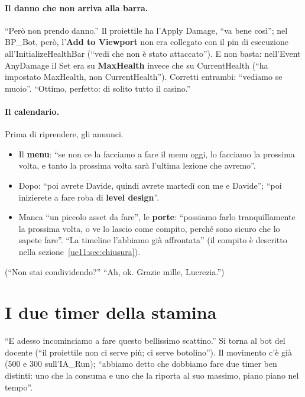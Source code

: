 \paragraph{Il danno che non arriva alla barra.} ``Però non prendo danno.'' Il proiettile ha
l'Apply Damage, ``va bene così''; nel BP\_Bot, però, l'\textbf{Add to Viewport} non era
collegato con il pin di esecuzione all'InitializeHealthBar (``vedi che non è stato
attaccato''). E non basta: nell'Event AnyDamage il Set era su \textbf{MaxHealth} invece che
su CurrentHealth (``ha impostato MaxHealth, non CurrentHealth''). Corretti entrambi:
``vediamo se muoio''. ``Ottimo, perfetto: di solito tutto il casino.''

\paragraph{Il calendario.} Prima di riprendere, gli annunci.
\begin{itemize}
  \item Il \textbf{menu}: ``se non ce la facciamo a fare il menu oggi, lo facciamo la
        prossima volta, e tanto la prossima volta sarà l'ultima lezione che avremo''.
  \item Dopo: ``poi avrete Davide, quindi avrete martedì con me e Davide''; ``poi
        inizierete a fare roba di \textbf{level design}''.
  \item Manca ``un piccolo asset da fare'', le \textbf{porte}: ``possiamo farlo
        tranquillamente la prossima volta, o ve lo lascio come compito, perché sono sicuro
        che lo sapete fare''. ``La timeline l'abbiamo già affrontata'' (il compito è
        descritto nella sezione~\ref{ue11:sec:chiusura}).
\end{itemize}
(``Non stai condividendo?'' ``Ah, ok. Grazie mille, Lucrezia.'')

\section{I due timer della stamina}
\label{ue11:sec:timer}

``E adesso incominciamo a fare questo bellissimo scattino.'' Si torna al bot del docente
(``il proiettile non ci serve più; ci serve botolino''). Il movimento c'è già (500 e 300
sull'IA\_Run); ``abbiamo detto che dobbiamo fare due timer ben distinti: uno che la consuma
e uno che la riporta al suo massimo, piano piano nel tempo''.


